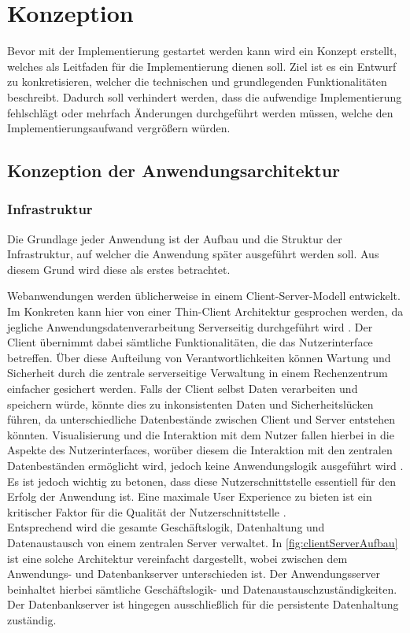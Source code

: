 \chapter{Konzeption}
Bevor mit der Implementierung gestartet werden kann wird ein Konzept erstellt, welches als Leitfaden für die Implementierung dienen soll.
Ziel ist es ein Entwurf zu konkretisieren, welcher die technischen und grundlegenden Funktionalitäten beschreibt.
Dadurch soll verhindert werden, dass die aufwendige Implementierung fehlschlägt oder mehrfach Änderungen durchgeführt werden müssen, welche den Implementierungsaufwand vergrößern würden.


\section{Konzeption der Anwendungsarchitektur}

\subsection{Infrastruktur}
Die Grundlage jeder Anwendung ist der Aufbau und die Struktur der Infrastruktur, auf welcher die Anwendung später ausgeführt werden soll.
Aus diesem Grund wird diese als erstes betrachtet.


Webanwendungen werden üblicherweise in einem Client-Server-Modell entwickelt. Im Konkreten kann hier von einer Thin-Client Architektur gesprochen werden, da jegliche Anwendungsdatenverarbeitung Serverseitig durchgeführt wird \autocite{definitionOfThinClient}. %
Der Client übernimmt dabei sämtliche Funktionalitäten, die das Nutzerinterface betreffen. Über diese Aufteilung von Verantwortlichkeiten können Wartung und Sicherheit durch die zentrale serverseitige Verwaltung in einem Rechenzentrum einfacher gesichert werden. Falls der Client selbst Daten verarbeiten und speichern würde, könnte dies zu inkonsistenten Daten und Sicherheitslücken führen, da unterschiedliche Datenbestände zwischen Client und Server entstehen könnten. 
Visualisierung und die Interaktion mit dem Nutzer fallen hierbei in die Aspekte des Nutzerinterfaces, worüber diesem die Interaktion mit den zentralen Datenbeständen ermöglicht wird, jedoch keine Anwendungslogik ausgeführt wird \autocite{thinClientArchitectureOverview}. Es ist jedoch wichtig zu betonen, dass diese Nutzerschnittstelle essentiell für den Erfolg der Anwendung ist. Eine maximale User Experience \autocite{definitionUserExperience} zu bieten ist ein kritischer Faktor für die Qualität der Nutzerschnittstelle \autocite{thinClientArchitectureOverview}.\\
Entsprechend wird die gesamte Geschäftslogik, Datenhaltung und Datenaustausch von einem zentralen Server verwaltet. 
In \autoref{fig:clientServerAufbau} ist eine solche Architektur vereinfacht dargestellt, wobei zwischen dem Anwendungs- und Datenbankserver unterschieden ist. Der Anwendungsserver beinhaltet hierbei sämtliche Geschäftslogik- und Datenaustauschzuständigkeiten. Der Datenbankserver ist hingegen ausschließlich für die persistente Datenhaltung zuständig.

